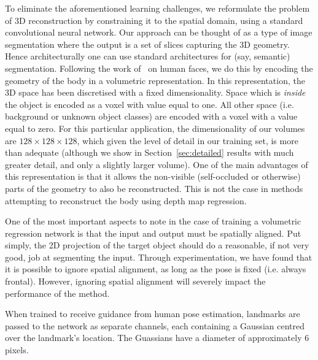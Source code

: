 To eliminate the aforementioned learning challenges, we reformulate
the problem of 3D reconstruction by constraining it to the spatial
domain, using a standard convolutional neural network. Our approach
can be thought of as a type of image segmentation where the output is
a set of slices capturing the 3D geometry. Hence architecturally one
can use standard architectures for (say, semantic)
segmentation. Following the work of~\cite{jackson2017vrn} on human
faces, we do this by encoding the geometry of the body in a volumetric
representation. In this representation, the 3D space has been
discretised with a fixed dimensionality. Space which is
\textit{inside} the object is encoded as a voxel with value equal to
one. All other space (i.e. background or unknown object classes) are
encoded with a voxel with a value equal to zero. For this particular
application, the dimensionality of our volumes are
$128\times 128\times 128$, which given the level of detail in our
training set, is more than adequate (although we show in
Section~\ref{sec:detailed} results with much greater detail, and only
a slightly larger volume). One of the main advantages of this
representation is that it allows the non-visible (self-occluded or
otherwise) parts of the geometry to also be reconstructed. This is not
the case in methods attempting to reconstruct the body using depth map
regression.


One of the most important aspects to note in the case of training a
volumetric regression network is that the input and output must be
spatially aligned. Put simply, the 2D projection of the target object
should do a reasonable, if not very good, job at segmenting the
input. Through experimentation, we have found that it is possible to
ignore spatial alignment, as long as the pose is fixed (i.e. always
frontal). However, ignoring spatial alignment will severely impact the
performance of the method.

When trained to receive guidance from human pose estimation, landmarks
are passed to the network as separate channels, each containing a
Gaussian centred over the landmark's location. The Guassians have a
diameter of approximately 6 pixels.

